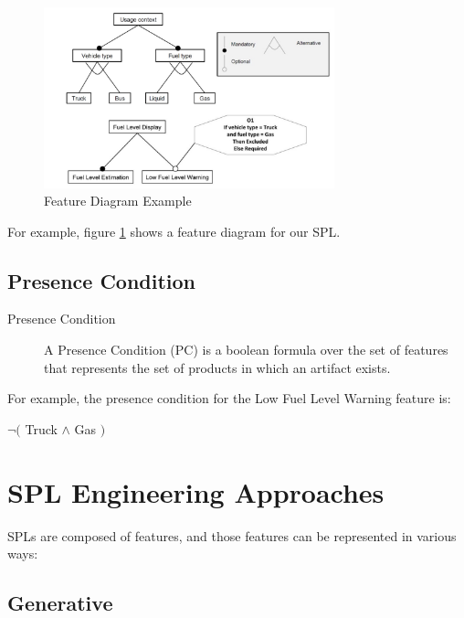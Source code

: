 \documentclass[11pt]{article}
\begin{document}
\begin{figure}
  \centering
    \includegraphics[width=0.75\textwidth]{FeatureDiagram}
  \caption{Feature Diagram Example}
  \label{fig:FeatureDiagram}
\end{figure}

For example, figure \ref{fig:FeatureDiagram} shows a feature diagram for our SPL.

\subsection{Presence Condition}

\begin{description}

\item[Presence Condition]
A Presence Condition (PC) is a boolean formula over the set of features that represents the set of products in which an artifact exists.
\end{description}

For example, the presence condition for the Low Fuel Level Warning feature is: 

$\neg ($ Truck $\wedge$ Gas $)$

\section{SPL Engineering Approaches}

SPLs are composed of features, and those features can be represented in various ways:


\subsection{Generative}
\end{document}
